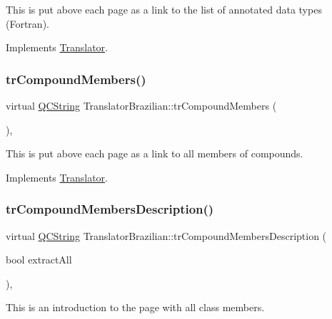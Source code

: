 This is put above each page as a link to the list of annotated data types (Fortran). 

Implements \mbox{\hyperlink{class_translator}{Translator}}.

\mbox{\label{class_translator_brazilian_a39628ec19a7c2a60d679967d2d87058b}} 
\subsubsection{\texorpdfstring{trCompoundMembers()}{trCompoundMembers()}}
{\footnotesize\ttfamily virtual \mbox{\hyperlink{class_q_c_string}{Q\+C\+String}} Translator\+Brazilian\+::tr\+Compound\+Members (\begin{DoxyParamCaption}{ }\end{DoxyParamCaption})\hspace{0.3cm}{\ttfamily [inline]}, {\ttfamily [virtual]}}

This is put above each page as a link to all members of compounds. 

Implements \mbox{\hyperlink{class_translator}{Translator}}.

\mbox{\label{class_translator_brazilian_ae8bb17745312e11222333d37a8699b85}} 
\subsubsection{\texorpdfstring{trCompoundMembersDescription()}{trCompoundMembersDescription()}}
{\footnotesize\ttfamily virtual \mbox{\hyperlink{class_q_c_string}{Q\+C\+String}} Translator\+Brazilian\+::tr\+Compound\+Members\+Description (\begin{DoxyParamCaption}\item[{bool}]{extract\+All }\end{DoxyParamCaption})\hspace{0.3cm}{\ttfamily [inline]}, {\ttfamily [virtual]}}

This is an introduction to the page with all class members. 

